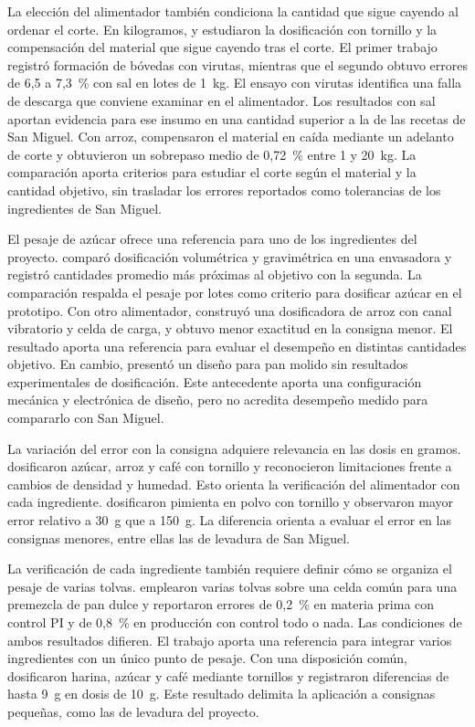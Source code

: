 La elección del alimentador también condiciona la cantidad que sigue
cayendo al ordenar el corte. En kilogramos, \textcite{bulatov2021dosing} y
\textcite{bulatov2021weighing} estudiaron la dosificación con tornillo y la
compensación del material que sigue cayendo tras el corte. El primer
trabajo registró formación de bóvedas con virutas, mientras que el segundo
obtuvo errores de 6,5 a 7,3~\% con sal en lotes de 1~kg. El ensayo con
virutas identifica una falla de descarga que conviene examinar en el
alimentador. Los resultados con sal aportan evidencia para ese insumo
en una cantidad superior a la de las recetas de San Miguel.
Con arroz, \textcite{hadi2025weighing} compensaron el material en caída
mediante un adelanto de corte y obtuvieron un sobrepaso medio de 0,72~\%
entre 1 y 20~kg.
La comparación aporta criterios para estudiar el corte según el
material y la cantidad objetivo, sin trasladar los errores reportados
como tolerancias de los ingredientes de San Miguel.

El pesaje de azúcar ofrece una referencia para uno de los ingredientes
del proyecto. \textcite{acuna2024gravimetrico} comparó dosificación
volumétrica y gravimétrica en una envasadora y registró cantidades
promedio más próximas al objetivo con la segunda. La comparación respalda
el pesaje por lotes como criterio para dosificar azúcar en el prototipo.
Con otro alimentador, \textcite{orozco2024dosificadora} construyó una
dosificadora de arroz con canal vibratorio y celda de carga, y obtuvo
menor exactitud en la consigna menor. El resultado aporta una referencia
para evaluar el desempeño en distintas cantidades objetivo. En cambio,
\textcite{challco2024dosificadora} presentó un diseño para pan molido
sin resultados experimentales de dosificación. Este antecedente aporta
una configuración mecánica y electrónica de diseño, pero no acredita
desempeño medido para compararlo con San Miguel.

La variación del error con la consigna adquiere relevancia en las dosis
en gramos. \textcite{david2024granulated} dosificaron
azúcar, arroz y café con tornillo y reconocieron limitaciones frente a
cambios de densidad y humedad. Esto orienta la verificación del alimentador
con cada ingrediente. \textcite{zaenurrohman2023merica} dosificaron
pimienta en polvo con tornillo y observaron mayor error relativo a 30~g
que a 150~g. La diferencia orienta a evaluar el error en las consignas
menores, entre ellas las de levadura de San Miguel.

La verificación de cada ingrediente también requiere definir cómo se
organiza el pesaje de varias tolvas.
\textcite{farihin2021premix} emplearon varias tolvas sobre una celda común
para una premezcla de pan dulce y reportaron errores de 0,2~\% en materia
prima con control PI y de 0,8~\% en producción con control todo o nada.
Las condiciones de ambos resultados difieren. El trabajo aporta una referencia
para integrar varios ingredientes con un único punto de pesaje.
Con una disposición común, \textcite{joni2022powder} dosificaron harina,
azúcar y café mediante tornillos y registraron diferencias de hasta 9~g
en dosis de 10~g. Este resultado delimita la aplicación a consignas
pequeñas, como las de levadura del proyecto.

